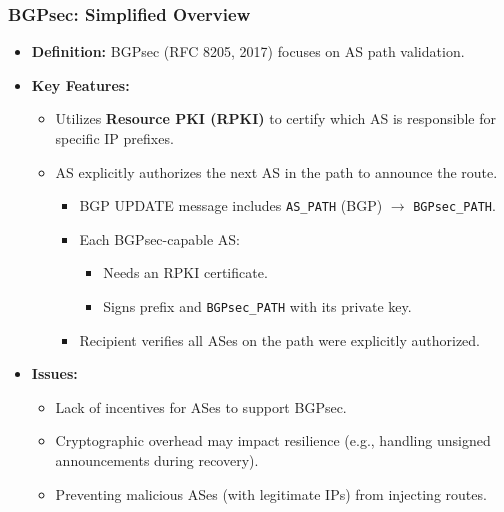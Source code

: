 \subsubsection{BGPsec: Simplified Overview}
\begin{itemize}
    \item \textbf{Definition:} BGPsec (RFC 8205, 2017) focuses on AS path validation.
    \item \textbf{Key Features:}
    \begin{itemize}
        \item Utilizes \textbf{Resource PKI (RPKI)} to certify which AS is responsible for specific IP prefixes.
        \item AS explicitly authorizes the next AS in the path to announce the route.
        \begin{itemize}
            \item BGP UPDATE message includes \texttt{AS\_PATH} (BGP) $\rightarrow$ \texttt{BGPsec\_PATH}.
            \item Each BGPsec-capable AS:
            \begin{itemize}
                \item Needs an RPKI certificate.
                \item Signs prefix and \texttt{BGPsec\_PATH} with its private key.
            \end{itemize}
            \item Recipient verifies all ASes on the path were explicitly authorized.
        \end{itemize}
    \end{itemize}
    \item \textbf{Issues:}
    \begin{itemize}
        \item Lack of incentives for ASes to support BGPsec.
        \item Cryptographic overhead may impact resilience (e.g., handling unsigned announcements during recovery).
        \item Preventing malicious ASes (with legitimate IPs) from injecting routes.
    \end{itemize}
\end{itemize}

